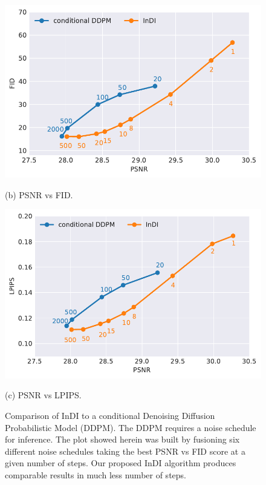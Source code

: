 \begin{figure}[t]
    \centering
    \begin{minipage}[c]{.47\textwidth}
    \centering\small
    \includegraphics[width=0.9\linewidth]{assets/pd_curve_dejpeg_q15_ddpm_fid_53747222_indi.pdf}
    
    (b) PSNR vs FID.
    \end{minipage}
    \begin{minipage}[c]{.47\textwidth}
    \centering\small
    \includegraphics[width=0.9\linewidth]{assets/pd_curve_dejpeg_q15_ddpm_lpips_53747222_indi.pdf}
    
    (c) PSNR vs LPIPS.
    \end{minipage}
    

    \caption{Comparison of InDI to a conditional Denoising Diffusion Probabilistic Model (DDPM). The DDPM requires a noise schedule for inference. The plot showed herein was built by fusioning six different noise schedules taking the best PSNR vs FID score at a given number of steps. Our proposed InDI algorithm produces comparable results in much less number of steps.}
    \label{fig:dejpeg_ddpm}
\end{figure}